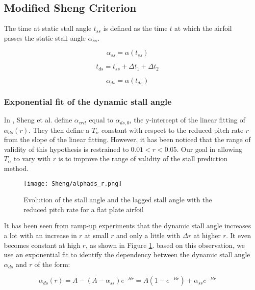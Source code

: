 \subsection{Modified Sheng Criterion}

The time at static stall angle $t_{ss}$ is defined as the time $t$ at which the airfoil passes the static stall angle $\alpha_{ss}$.

\begin{equation}
\alpha_{ss} = \alpha(t_{ss})
\end{equation}

\begin{equation}
t_{ds} = t_{ss} +  \Delta t_1 + \Delta t_2
\end{equation}

\begin{equation}
\alpha_{ds} = \alpha(t_{ds})
\end{equation}

\subsubsection{Exponential fit of the dynamic stall angle}

In \autocite{sheng_new_2006},  Sheng et al. define $\alpha_{crit}$ equal to  $\alpha_{ds,0}$, the y-intercept of the linear fitting of $\alpha_{ds}(r)$. They then define a  $T_\alpha$ constant with respect to the reduced pitch rate $r$ from the slope of the linear fitting. However, it has been noticed that the range of validity of this hypothesis is restrained to $0.01<r<0.05$. Our goal in allowing $T_\alpha$ to vary with $r$ is to improve the range of validity of the stall prediction method. 

\begin{figure}[h]
\centering
\texttt{[image: Sheng/alphads\_r.png]} 
\caption{Evolution of the stall angle and the lagged stall angle with the reduced pitch rate for a flat plate airfoil}
\label{fig:alphads_r}
\end{figure}

It has been seen from ramp-up experiments that the dynamic stall angle increases a lot with an increase in $r$ at small $r$ and only a little with $\Delta r$ at higher $r$. It even becomes constant at high $r$, as shown in Figure \ref{fig:alphads_r}. based on this observation, we use an exponential fit to identify the dependency between the dynamic stall angle $\alpha_{ds}$ and $r$ of the form: 

\begin{equation}
\alpha_{ds}(r) = A-(A-\alpha_{ss})e^{-Br} = A(1-e^{-Br})+\alpha_{ss}e^{-Br}
\label{eq:alpha_ds_r}
\end{equation}

